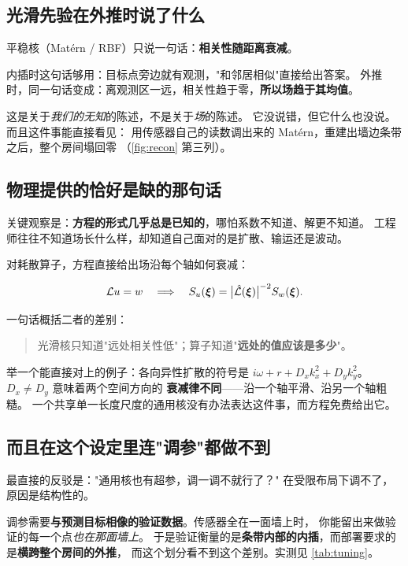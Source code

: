 \documentclass[11pt,a4paper]{article}
\begin{document}
\subsection{光滑先验在外推时说了什么}

平稳核（Matérn / RBF）只说一句话：\textbf{相关性随距离衰减}。

内插时这句话够用：目标点旁边就有观测，"和邻居相似"直接给出答案。
外推时，同一句话变成：离观测区一远，相关性趋于零，\textbf{所以场趋于其均值}。

这是关于\emph{我们的无知}的陈述，不是关于\emph{场}的陈述。
它没说错，但它什么也没说。而且这件事能直接看见：
用传感器自己的读数调出来的 Matérn，重建出墙边条带之后，整个房间塌回零
（\cref{fig:recon} 第三列）。

\subsection{物理提供的恰好是缺的那句话}

关键观察是：\textbf{方程的形式几乎总是已知的}，哪怕系数不知道、解更不知道。
工程师往往不知道场长什么样，却知道自己面对的是扩散、输运还是波动。

对耗散算子，方程直接给出场沿每个轴如何衰减：

\begin{equation}
\mathcal{L} u = w \quad\Longrightarrow\quad
S_u(\boldsymbol{\xi}) = \bigl\lvert \hat{\mathcal{L}}(\boldsymbol{\xi}) \bigr\rvert^{-2} S_w(\boldsymbol{\xi}).
\label{eq:transfer}
\end{equation}

一句话概括二者的差别：

\begin{quote}
光滑核只知道"远处相关性低"；算子知道"\textbf{远处的值应该是多少}"。
\end{quote}

举一个能直接对上的例子：各向异性扩散的符号是
$i\omega + r + D_x k_x^2 + D_y k_y^2$。$D_x \neq D_y$ 意味着两个空间方向的
\textbf{衰减律不同}——沿一个轴平滑、沿另一个轴粗糙。
一个共享单一长度尺度的通用核没有办法表达这件事，而方程免费给出它。

\subsection{而且在这个设定里连"调参"都做不到}

最直接的反驳是："通用核也有超参，调一调不就行了？"
在受限布局下调不了，原因是结构性的。

调参需要\textbf{与预测目标相像的验证数据}。传感器全在一面墙上时，
你能留出来做验证的每一个点\emph{也在那面墙上}。
于是验证衡量的是\textbf{条带内部的内插}，而部署要求的是\textbf{横跨整个房间的外推}，
而这个划分看不到这个差别。实测见 \cref{tab:tuning}。
\end{document}
